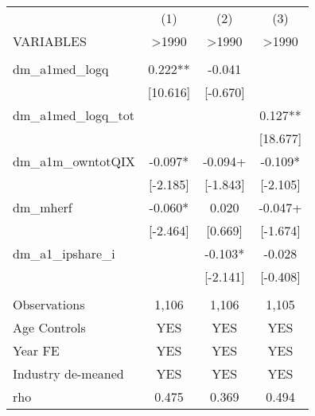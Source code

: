 \documentclass[]{article}
\begin{document}
\begin{tabular}{lccc} \hline
 & (1) & (2) & (3) \\
VARIABLES & >1990 & >1990 & >1990 \\ \hline
 &  &  &  \\
dm\_a1med\_logq & 0.222** & -0.041 &  \\
 & [10.616] & [-0.670] &  \\
dm\_a1med\_logq\_tot &  &  & 0.127** \\
 &  &  & [18.677] \\
dm\_a1m\_owntotQIX & -0.097* & -0.094+ & -0.109* \\
 & [-2.185] & [-1.843] & [-2.105] \\
dm\_mherf & -0.060* & 0.020 & -0.047+ \\
 & [-2.464] & [0.669] & [-1.674] \\
dm\_a1\_ipshare\_i &  & -0.103* & -0.028 \\
 &  & [-2.141] & [-0.408] \\
 &  &  &  \\
Observations & 1,106 & 1,106 & 1,105 \\
Age Controls & YES & YES & YES \\
Year FE & YES & YES & YES \\
Industry de-meaned & YES & YES & YES \\
 rho & 0.475 & 0.369 & 0.494 \\ \hline
\end{tabular}
\end{document}
